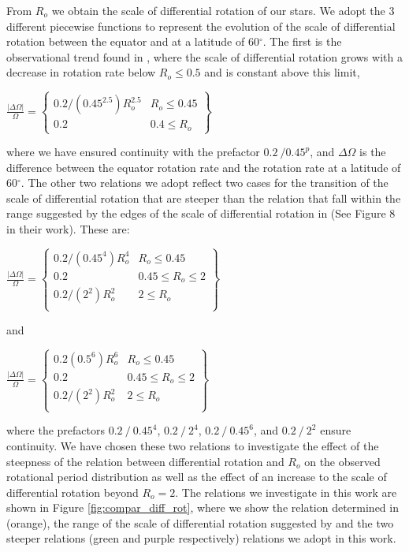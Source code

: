 From $R_o$ we obtain the scale of differential rotation of our stars.
We adopt the 3 different piecewise functions to represent the evolution of the scale of differential rotation between the equator and at a latitude of 60$^{\circ}$.
The first is the observational trend found in \citet{saar_starspots_2011}, where the scale of differential rotation grows with a decrease in rotation rate below $R_o\leq0.5$ and is constant above this limit,
{\centering
$\frac{|\Delta\Omega|}{\Omega} = \left\{
\begin{array}{ll}
   0.2/(0.45^{2.5}) R_o^{2.5}& R_o\leq 0.45 \\
   0.2 & 0.4 \leq R_o
\end{array} 
\right\}$\par}
where we have ensured continuity with the prefactor $0.2 \ / 0.45^{p}$, and $\Delta \Omega$ is the difference between the equator rotation rate and the rotation rate at a latitude of 60$^{\circ}$.
The other two relations we adopt reflect two cases for the transition of the scale of differential rotation that are steeper than the \citet{saar_starspots_2011} relation that fall within the range suggested by the edges of the scale of differential rotation in \citet{brun_powering_2022} (See Figure 8 in their work).
These are:
{\centering
$\frac{|\Delta\Omega|}{\Omega} = \left\{
\begin{array}{ll}
   0.2/(0.45^4) R_o^4& R_o\leq 0.45 \\
   0.2 & 0.45\leq R_o\leq 2 \\
   0.2/(2^2) R_o^2& 2\leq R_o \\
\end{array} 
\right\}$\par}


and

{\centering
$\frac{|\Delta\Omega|}{\Omega} =  \left\{
\begin{array}{ll}
   0.2(0.5^6) R_o^6& R_o\leq 0.45 \\
   0.2 & 0.45\leq R_o\leq 2 \\
   0.2/(2^2) R_o^2 & 2\leq R_o \\
\end{array} 
\right\}$\par}

where the prefactors $0.2 \ / \ 0.45^{4}$, $0.2 \ / \ 2^{4}$, $0.2 \ / \ 0.45^{6}$, and $0.2 \ / \ 2^{2}$ ensure continuity.
We have chosen these two relations to investigate the effect of the steepness of the relation between differential rotation and $R_o$ on the observed rotational period distribution as well as the effect of an increase to the scale of differential rotation beyond $R_o = 2$.
The relations we investigate in this work are shown in Figure \ref{fig:compar_diff_rot}, where we show the relation determined in \citet{saar_starspots_2011} (orange), the range of the scale of differential rotation suggested by \citet{brun_powering_2022} and the two steeper relations (green and purple respectively) relations we adopt in this work.

